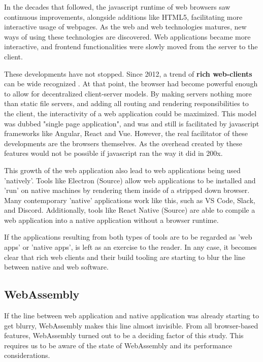 In the decades that followed, the javascript runtime of web browsers saw continuous improvements, alongside additions like HTML5, facilitating more interactive usage of webpages.
As the web and web technologies matures, new ways of using these technologies are discovered.
Web applications became more interactive, and frontend functionalities were slowly moved from the server to the client. 

These developments have not stopped. Since 2012, a trend of \textbf{rich web-clients} can be wide recognized \cite{hamilton_client-side_2014, panidi_hybrid_2015, kulawiak_analysis_2019}.
At that point, the browser had become powerful enough to allow for decentralized client-server models.
By making servers nothing more than static file servers, and adding all routing and rendering responsibilities to the client, the interactivity of a web application could be maximized. 
This model was dubbed "single page application", and was and still is facilitated by javascript frameworks like Angular, React and Vue.
However, the real facilitator of these developments are the browsers themselves.
As the overhead created by these features would not be possible if javascript ran the way it did in 200x. 

This growth of the web application also lead to web applications being used 'natively'. 
Tools like Electron (Source) allow web applications to be installed and 'run' on native machines by rendering them inside of a stripped down browser. 
Many contemporary 'native' applications work like this, such as VS Code, Slack, and Discord.
Additionally, tools like React Native (Source) are able to compile a web application into a native application without a browser runtime.  

If the applications resulting from both types of tools are to be regarded as 'web apps' or 'native apps', is left as an exercise to the reader. 
In any case, it becomes clear that rich web clients and their build tooling are starting to blur the line between native and web software.

\subsection{WebAssembly}
\label{sec:background-wasm}

If the line between web application and native application was already starting to get blurry, WebAssembly makes this line almost invisible. 
From all browser-based features, WebAssembly turned out to be a deciding factor of this study. This requires us to be aware of the state of WebAssembly and its performance considerations.

